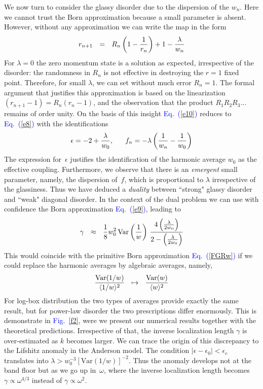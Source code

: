 \documentclass[onecolumn,fleqn,notitlepage,secnumarabic]{revtex4}
\newcommand{\Eq}[1]{\textcolor{blue}{Eq.\!\!~(\ref{#1})}}
\newcommand{\Fig}[1]{\textcolor{blue}{Fig.}\!\!~\ref{#1}}
\newcommand{\be}[1]{\begin{eqnarray}\ifthenelse{#1=-1}{\nonumber}{\ifthenelse{#1=0}{}{\label{e#1}}}}
\newcommand{\ee}{\end{eqnarray}}
\newcommand{\beq}{\be{1}}
\newcommand{\eeq}{\ee}
\begin{document}
%
We now turn to consider the glassy disorder due to the dispersion of the $w_n$. 
Here we cannot trust the Born approximation because a small parameter is absent. 
However, without any approximation we can write the map in the form 
%
\be{10}
r_{n+1} \ \ = \ \ R_n \left( 1 - \frac{1}{r_n}\right) + 1 -\frac{\lambda}{w_n} 
\eeq
%
For $\lambda{=}0$ the zero momentum state is a solution as expected, 
irrespective of the disorder: the randomness in $R_n$ is not effective 
in destroying the ${r=1}$ fixed point. Therefore, for small $\lambda$, 
we can set without much error ${R_n=1}$. The formal argument that justifies 
this approximation is based on the linearization ${(r_{n+1}-1)=R_n(r_n-1)}$, 
and the observation that the product ${R_1R_2R_3...}$ remains of order unity. 
On the basis of this insight \Eq{e10} reduces to \Eq{e8} with the identifications 
%
\beq
\epsilon = -2 + \frac{\lambda}{w_0}, 
\ \ \ \ \ f_n = -\lambda \left(\frac{1}{w_n}-\frac{1}{w_0} \right)
\eeq 
%
The expression for~$\epsilon$ justifies the identification of the harmonic average $w_0$ 
as the effective coupling. Furthermore, we observe that there is an {\em emergent} small parameter, 
namely, the dispersion of~$f$, which is proportional to $\lambda$ irrespective of the glassiness. 
Thus we have deduced a {\em duality} between ``strong" glassy disorder and ``weak" diagonal disorder.
%
In the context of the dual problem we can use with confidence the Born approximation \Eq{e9}, leading to  
%
\be{12}
\gamma \ \ \approx \ \ \frac{1}{8} w_0^2 \, \mbox{Var}\left(\frac{1}{w}\right)  
\, \frac{4\left(\frac{\lambda}{2w_0}\right)}{2-\left(\frac{\lambda}{2w_0}\right)}
\eeq
% 
This would coincide with the primitive Born approximation \Eq{FGRw} 
if we could replace the harmonic averages by algebraic averages, namely,  
%
\beq
\frac{\mbox{Var}(1/w)}{\langle 1/w \rangle^2} 
\ \ \mapsto \ \ 
\frac{\mbox{Var}(w)}{\langle w \rangle^2} 
\eeq 
%
For log-box distribution the two types of averages provide exactly the same result, but for 
power-law disorder the two prescriptions differ enormously. This is demonstrate in \Fig{f2}, 
were we present our numerical results together with the theoretical predictions. 
%
Irrespective of that, the inverse localization length $\gamma$ is over-estimated as $k$ becomes larger. 
We can trace the origin of this discrepancy to the Lifshitz anomaly in the Anderson model.
The condition ${|\epsilon-\epsilon_0|<\epsilon_c}$ translates into ${\lambda > w_0^{-3}[\mbox{Var}(1/w)]^{-2}}$.
Thus the anomaly develops not at the band floor but as we go up in~$\omega$, 
where the inverse localization length becomes $\gamma \propto \omega^{4/3}$ 
instead of $\gamma \propto \omega^2$. 
\end{document}
